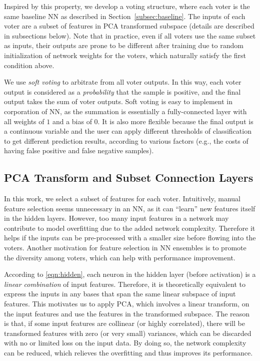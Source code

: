 \documentclass[10pt, final, letter, twocolumns]{IEEEtran}
\begin{document}
Inspired by this property, we develop a voting structure, where each voter is the same baseline NN as described in Section~\ref{subsec:baseline}. The inputs of each voter are a subset of features in PCA transformed subspace (details are described in subsections below). Note that in practice, even if all voters use the same subset as inputs, their outputs are prone to be different after training due to random initialization of network weights for the voters, which naturally satisfy the first condition above.

We use \emph{soft voting} to arbitrate from all voter outputs. In this way, each voter output is considered as a \emph{probability} that the sample is positive,  and the final output takes the sum of voter outputs. Soft voting is easy to implement in corporation of NN, as the summation is essentially a fully-connected layer with all weights of $1$ and a bias of $0$. It is also more flexible because the final output is a continuous variable and the user can apply different thresholds of classification to get different prediction results, according to various factors (e.g., the costs of having false positive and false negative samples).

\subsection{PCA Transform and Subset Connection Layers}\vspace{-1mm}
\label{subsec:PCA}
In this work, we select a subset of features for each voter. Intuitively, manual feature selection seems unnecessary in an NN, as it can ``learn'' new features itself in the hidden layers. However, too many input features in a network may contribute to model overfitting due to the added network complexity. Therefore it helps if the inputs can be pre-processed with a smaller size before flowing into the voters. Another motivation for feature selection in NN ensembles is to promote the diversity among voters, which can help with performance improvement.

According to \eqref{eqn:hidden}, each neuron in the hidden layer (before activation) is a \emph{linear combination} of input features. Therefore, it is theoretically equivalent to express the inputs in any bases that span the same linear subspace of input features. This motivates us to apply PCA, which involves a linear transform, on the input features and use the features in the transformed subspace. The reason is that, if some input features are collinear (or highly correlated), there will be transformed features with zero (or very small) variances, which can be discarded with no or limited loss on the input data. By doing so, the network complexity can be reduced, which relieves the overfitting and thus improves its performance.
\end{document}
